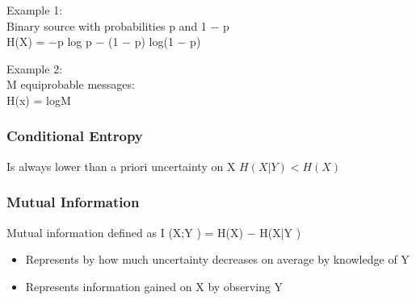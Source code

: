 

\begin{frame}


Example 1:\\ Binary source with probabilities p and 1 − p\\
H(X) = −p log p − (1 − p) log(1 − p)


Example 2:\\ M equiprobable messages: \\
H(x) = logM


\end{frame}




\begin{frame}
\frametitle{Conditional Entropy}
Is always lower than a priori uncertainty on X
$H(X|Y ) < H(X)$
\end{frame}




\begin{frame}
\frametitle{Mutual Information}
Mutual information defined as
I (X;Y ) = H(X) − H(X|Y )
\begin{itemize}


\item Represents by how much uncertainty decreases on average by knowledge of Y
\item Represents information gained on X by observing Y
\end{itemize}
\end{frame}




